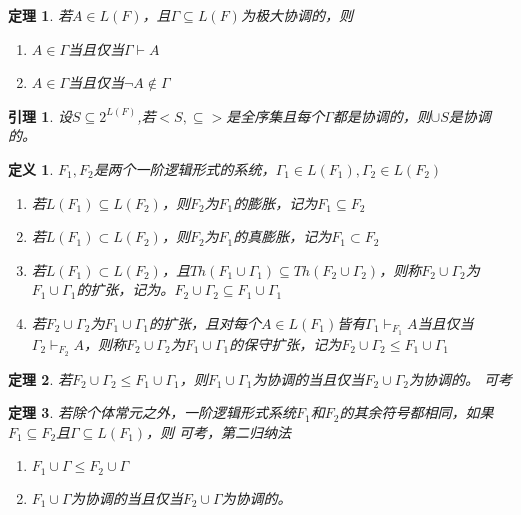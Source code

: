 \documentclass[a4paper]{ctexart}
\newtheorem{thm}{\hspace{2em}定理}[subsection]
\newtheorem{lem}{\hspace{2em}引理}
\newtheorem{defi}{\hspace{2em}定义}[subsection]
\newcommand{\shade}[1]{\colorbox{shadecolor}{#1}}
\begin{document}
\begin{thm}
  若$A\in L(F)$，且$\Gamma\subseteq L(F)$为极大协调的，则
  \begin{enumerate}[itemindent=2em]
    \item $A\in\Gamma$当且仅当$\Gamma\vdash A$
    \item $A\in \Gamma$当且仅当$\neg A\not\in\Gamma$
  \end{enumerate}
\end{thm}

\begin{lem}
  设$S\subseteq 2^{L(F)}$,若$<S,\subseteq>$是全序集且每个$\Gamma$都是协调的，则$\cup S$是协调的。
\end{lem}

\begin{defi}
  $F_1,F_2$是两个一阶逻辑形式的系统，$\Gamma_1\in L(F_1),\Gamma_2\in L(F_2)$
  \begin{enumerate}[itemindent=2em]
    \item 若$L(F_1)\subseteq L(F_2)$，则$F_2$为$F_1$的膨胀，记为$F_1\subseteq F_2$
    \item 若$L(F_1)\subset L(F_2)$，则$F_2$为$F_1$的真膨胀，记为$F_1\subset F_2$
    \item 若$L(F_1)\subset L(F_2)$，且$Th(F_1\cup\Gamma_1)\subseteq Th(F_2\cup\Gamma_2)$，则称$F_2\cup\Gamma_2$为$F_1\cup\Gamma_1$的扩张，记为。$F_2\cup\Gamma_2\subseteq F_1\cup\Gamma_1$
    \item 若$F_2\cup\Gamma_2$为$F_1\cup\Gamma_1$的扩张，且对每个$A\in L(F_1)$皆有$\Gamma_1\vdash_{F_1}A$当且仅当$\Gamma_2\vdash_{F_2}A$，则称$F_2\cup\Gamma_2$为$F_1\cup\Gamma_1$的保守扩张，记为$F_2\cup\Gamma_2\leq F_1\cup\Gamma_1$ 
  \end{enumerate}
\end{defi}

\begin{thm}
  若$F_2\cup\Gamma_2\leq F_1\cup\Gamma_1$，则$F_1\cup\Gamma_1$为协调的当且仅当$F_2\cup\Gamma_2$为协调的。 \shade{可考}
\end{thm}

\begin{thm}
  若除个体常元之外，一阶逻辑形式系统$F_1$和$F_2$的其余符号都相同，如果$F_1\subseteq F_2$且$\Gamma\subseteq L(F_1)$，则    \shade{可考，第二归纳法}
  \begin{enumerate}[itemindent=2em] 
    \item $F_1\cup\Gamma\leq F_2\cup\Gamma$
    \item $F_1\cup\Gamma$为协调的当且仅当$F_2\cup\Gamma$为协调的。
  \end{enumerate}
\end{thm}
\end{document}
